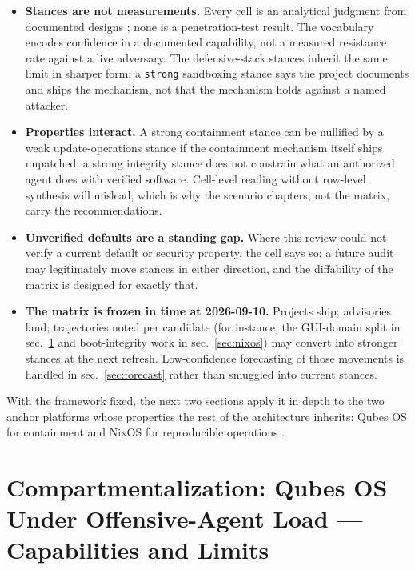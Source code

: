 \documentclass[
  english,
  9pt,
]{extarticle}
\newcounter{none} %
\providecommand{\tightlist}{%
  \setlength{\itemsep}{0pt}\setlength{\parskip}{0pt}}
\begin{document}
\begin{itemize}
\tightlist
\item
  \textbf{Stances are not measurements.} Every cell is an analytical
  judgment from documented designs \citep{saltzer1975}; none is a
  penetration-test result. The vocabulary encodes confidence in a
  documented capability, not a measured resistance rate against a live
  adversary. The defensive-stack stances inherit the same limit in
  sharper form: a \texttt{strong} sandboxing stance says the project
  documents and ships the mechanism, not that the mechanism holds
  against a named attacker.
\item
  \textbf{Properties interact.} A strong containment stance can be
  nullified by a weak update-operations stance if the containment
  mechanism itself ships unpatched; a strong integrity stance does not
  constrain what an authorized agent does with verified software.
  Cell-level reading without row-level synthesis will mislead, which is
  why the scenario chapters, not the matrix, carry the recommendations.
\item
  \textbf{Unverified defaults are a standing gap.} Where this review
  could not verify a current default or security property, the cell says
  so; a future audit may legitimately move stances in either direction,
  and the diffability of the matrix is designed for exactly that.
\item
  \textbf{The matrix is frozen in time at 2026-09-10.} Projects ship;
  advisories land; trajectories noted per candidate (for instance, the
  GUI-domain split in sec.~\ref{sec:qubes} and boot-integrity work in
  sec.~\ref{sec:nixos}) may convert into stronger stances at the next
  refresh. Low-confidence forecasting of those movements is handled in
  sec.~\ref{sec:forecast} rather than smuggled into current stances.
\end{itemize}

With the framework fixed, the next two sections apply it in depth to the
two anchor platforms whose properties the rest of the architecture
inherits: Qubes OS for containment \citep{qubes_architecture} and NixOS
for reproducible operations \citep{nixos_wiki}.

\newpage

\section{Compartmentalization: Qubes OS Under Offensive-Agent Load ---
Capabilities and Limits}\label{sec:qubes}
\end{document}
